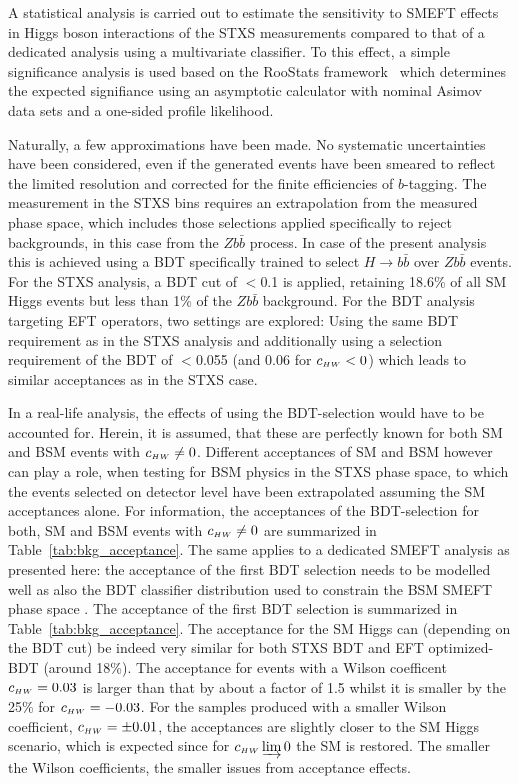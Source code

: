 A statistical analysis is carried out to estimate the sensitivity to SMEFT effects in Higgs boson interactions of the STXS measurements compared to that of a dedicated analysis using a multivariate classifier. To this effect, a simple significance analysis is used based on the {\sc RooStats} framework~\cite{Moneta:2010pm} which determines the expected signifiance using an asymptotic calculator with nominal Asimov data sets and a one-sided profile likelihood. 

Naturally, a few approximations have been made. No systematic uncertainties have been considered, even if the generated events have been smeared to reflect the limited resolution and corrected for the finite efficiencies of $b$-tagging. The measurement in the STXS bins requires an extrapolation from the measured phase space, which includes those selections applied specifically to reject backgrounds, in this case from the $Z b\bar{b}$ process. In case of the present analysis this is achieved using a BDT specifically trained to select $H\to b\bar{b}$ over $Z b\bar{b}$ events. For the STXS analysis, a BDT cut of $<$0.1 is applied, retaining 18.6\% of all SM Higgs events but less than 1\% of the $Z b\bar{b}$ background. For the BDT analysis targeting EFT operators, two settings are explored: Using the same BDT requirement as in the STXS analysis and additionally using a selection requirement of the BDT of $<$0.055 (and 0.06 for $c_{\scriptscriptstyle HW} <0$) which leads to similar acceptances as in the STXS case. 

In a real-life analysis, the effects of using the BDT-selection would have to be accounted for. Herein, it is assumed, that these are perfectly known for both SM and BSM events with $c_{\scriptscriptstyle HW} \neq 0$. Different acceptances of SM and BSM however can play a role, when testing for BSM physics in the STXS phase space, to which the events selected on detector level have been extrapolated assuming the SM acceptances alone. For information, the acceptances of the BDT-selection for both, SM and BSM events with $c_{\scriptscriptstyle HW} \neq 0$ are summarized in Table~\ref{tab:bkg_acceptance}. The same applies to a dedicated SMEFT analysis as presented here: the acceptance of the first BDT selection needs to be modelled well as also the BDT classifier distribution used to constrain the BSM SMEFT phase space . The acceptance of the first BDT selection is summarized in Table~\ref{tab:bkg_acceptance}. The acceptance for the SM Higgs can (depending on the BDT cut) be indeed very similar for both STXS BDT and EFT optimized-BDT (around 18\%). The acceptance for events with a Wilson coefficent $c_{\scriptscriptstyle HW}=0.03$ is larger than that by about a factor of 1.5 whilst it is smaller by the 25\% for $c_{\scriptscriptstyle HW}=-0.03$. For the samples produced with a smaller Wilson coefficient, $c_{\scriptscriptstyle HW} = \pm0.01$, the acceptances are slightly closer to the SM Higgs scenario, which is expected since for $c_{\scriptscriptstyle HW} \varinjlim 0$ the SM is restored. The smaller the Wilson coefficients, the smaller issues from acceptance effects. 

